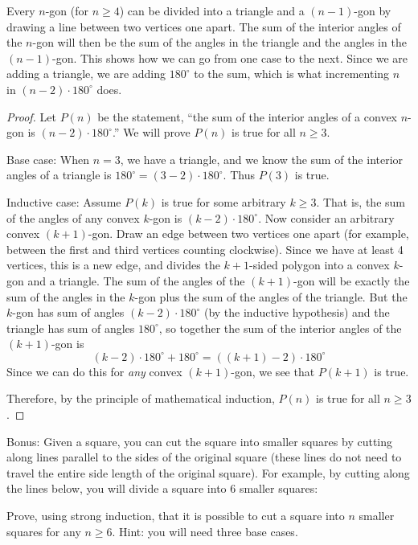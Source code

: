 \begin{solution}
Every $n$-gon (for $n \ge 4$) can be divided into a triangle and a $(n-1)$-gon by drawing a line between two vertices one apart.  The sum of the interior angles of the $n$-gon will then be the sum of the angles in the triangle and the angles in the $(n-1)$-gon.  This shows how we can go from one case to the next.  Since we are adding a triangle, we are adding $180^\circ$ to the sum, which is what incrementing $n$ in $(n-2)\cdot 180^\circ$ does.

\begin{proof}
Let $P(n)$ be the statement, ``the sum of the interior angles of a convex $n$-gon is $(n-2)\cdot 180^\circ$.''  We will prove $P(n)$ is true for all $n \ge 3$.

Base case: When $n=3$, we have a triangle, and we know the sum of the interior angles of a triangle is $180^\circ = (3-2)\cdot 180^\circ$.  Thus $P(3)$ is true.

Inductive case: Assume $P(k)$ is true for some arbitrary $k \ge 3$.  That is, the sum of the angles of any convex $k$-gon is $(k-2)\cdot 180^\circ$.  Now consider an arbitrary convex $(k+1)$-gon.  Draw an edge between two vertices one apart (for example, between the first and third vertices counting clockwise).  Since we have at least 4 vertices, this is a new edge, and divides the $k+1$-sided polygon into a convex $k$-gon and a triangle.  The sum of the angles of the $(k+1)$-gon will be exactly the sum of the angles in the $k$-gon plus the sum of the angles of the triangle.  But the $k$-gon has sum of angles $(k-2)\cdot 180^\circ$ (by the inductive hypothesis) and the triangle has sum of angles $180^\circ$, so together the sum of the interior angles of the $(k+1)$-gon is
\[(k-2)\cdot 180^\circ + 180^\circ = ((k+1)-2)\cdot 180^\circ\]
Since we can do this for \emph{any} convex $(k+1)$-gon, we see that $P(k+1)$ is true.

Therefore, by the principle of mathematical induction, $P(n)$ is true for all $n\ge 3$.

\end{proof}

\end{solution}



\question[5] Bonus: Given a square, you can cut the square into smaller squares by cutting along lines parallel to the sides of the original square (these lines do not need to travel the entire side length of the original square).  For example, by cutting along the lines below, you will divide a square into 6 smaller squares:
\begin{center}
\end{center}
Prove, using strong induction, that it is possible to cut a square into $n$ smaller squares for any $n \ge 6$.  Hint: you will need three base cases.

